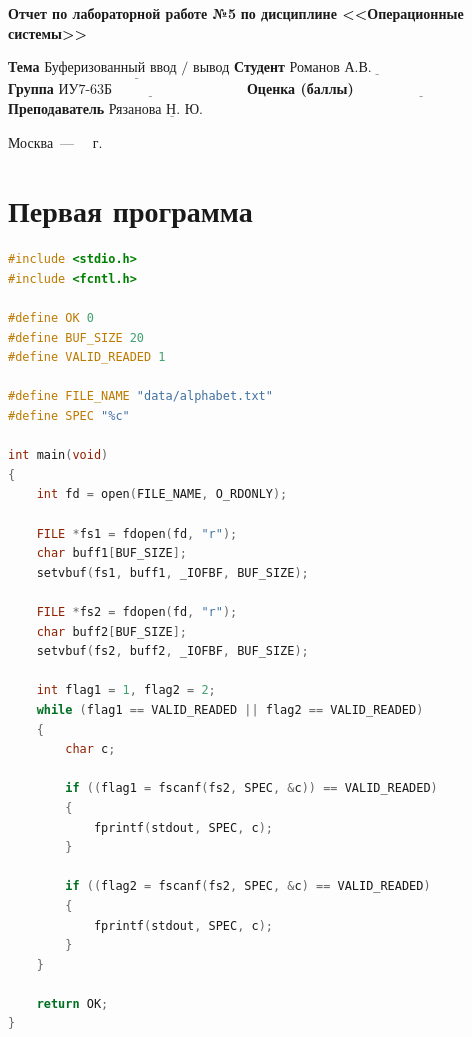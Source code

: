 \documentclass[12pt]{report}
\begin{document}
\begin{titlepage}
		\begin{center}
			\noindent\begin{minipage}{1.1\textwidth}\centering
				\Large\textbf{  Отчет по лабораторной работе №5}\newline
				\textbf{по дисциплине <<Операционные системы>>}\newline\newline\newline
			\end{minipage}
		\end{center}
		
		\noindent\textbf{Тема} $\underline{\text{Буферизованный ввод / вывод}}$\newline\newline
		\noindent\textbf{Студент} $\underline{\text{Романов А.В.~~~~~~~~~~~~~~~~~~~~}}$\newline\newline
		\noindent\textbf{Группа} $\underline{\text{ИУ7-63Б~~~~~~~~~~~~~~~~~~~~~~~~~~~~}}$\newline\newline
		\noindent\textbf{Оценка (баллы)} $\underline{\text{~~~~~~~~~~~~~~~~~~~~~~~~~~~}}$\newline\newline
		\noindent\textbf{Преподаватель} $\underline{\text{Рязанова Н. Ю.~~~~~~~}}$\newline\newline\newline
		
		\begin{center}
			\vfill
			Москва~---~\the\year
			~г.
		\end{center}
	\end{titlepage}
	

\chapter{Первая программа}

\begin{lstlisting}[language=c, label=p1, caption=Программа №1]
#include <stdio.h>
#include <fcntl.h>

#define OK 0
#define BUF_SIZE 20
#define VALID_READED 1

#define FILE_NAME "data/alphabet.txt"
#define SPEC "%c"

int main(void)
{
	int fd = open(FILE_NAME, O_RDONLY);
	
	FILE *fs1 = fdopen(fd, "r");
	char buff1[BUF_SIZE];
	setvbuf(fs1, buff1, _IOFBF, BUF_SIZE);
	
	FILE *fs2 = fdopen(fd, "r");
	char buff2[BUF_SIZE];
	setvbuf(fs2, buff2, _IOFBF, BUF_SIZE);
	
	int flag1 = 1, flag2 = 2;
	while (flag1 == VALID_READED || flag2 == VALID_READED)
	{
		char c;
		
		if ((flag1 = fscanf(fs2, SPEC, &c)) == VALID_READED)
		{
			fprintf(stdout, SPEC, c);
		}
		
		if ((flag2 = fscanf(fs2, SPEC, &c) == VALID_READED)
		{
			fprintf(stdout, SPEC, c);
		}
	}
	
	return OK;
}
\end{lstlisting}
\end{document}
